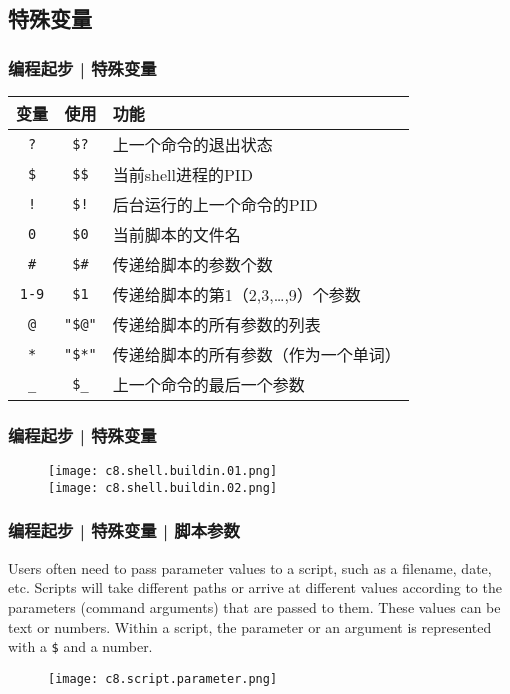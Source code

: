 \subsection{特殊变量}
\begin{frame}[fragile]
  \frametitle{编程起步 | \alert{特殊变量}}
  \begin{table}
    \centering
    \begin{tabularx}{0.8\textwidth}{ccX}
      \hline
      \rowcolor{blue!50}变量 & 使用 & 功能\\
      \hline
      \verb|?| & \verb|$?| & 上一个命令的退出状态\\
      \verb|$| & \verb|$$| & 当前shell进程的PID\\
      \verb|!| & \verb|$!| & 后台运行的上一个命令的PID\\
      \verb|0| & \verb|$0| & 当前脚本的文件名\\
      \verb|#| & \verb|$#| & 传递给脚本的参数个数\\
      \verb|1-9| & \verb|$1| & 传递给脚本的第1（2,3,\ldots,9）个参数\\
      \verb|@| & \verb|"$@"| & 传递给脚本的所有参数的列表\\
      \verb|*| & \verb|"$*"| & 传递给脚本的所有参数（作为一个单词）\\
      \verb|_| & \verb|$_| & 上一个命令的最后一个参数\\
      \hline
    \end{tabularx}
  \end{table}
\end{frame}

\begin{frame}
  \frametitle{编程起步 | 特殊变量}
  \begin{figure}
    \centering
    \texttt{[image: c8.shell.buildin.01.png]}\\
    \texttt{[image: c8.shell.buildin.02.png]}
  \end{figure}
\end{frame}

\begin{frame}[fragile]
  \frametitle{编程起步 | 特殊变量 | 脚本参数}
  Users often need to pass parameter values to a script, such as a filename, date, etc. Scripts will take different paths or arrive at different values according to the parameters (command arguments) that are passed to them. These values can be text or numbers. Within a script, the parameter or an argument is represented with a \verb|$| and a number.
  \begin{figure}
    \centering
    \texttt{[image: c8.script.parameter.png]}
  \end{figure}
\end{frame}

